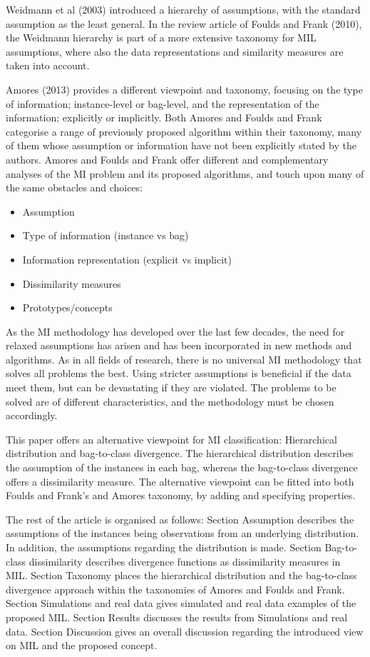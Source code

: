 {\color{green} Weidmann et al (2003)} introduced a hierarchy of assumptions, with the standard assumption as the least general. 
In the review article of {\color{green} Foulds and Frank (2010)}, the Weidmann hierarchy is part of a more extensive taxonomy for MIL assumptions, where also the data representations and similarity measures are taken into account. 

{\color{green} Amores (2013)} provides a different viewpoint and taxonomy, focusing on the type of information; instance-level or bag-level, and the representation of the information; explicitly or implicitly. 
Both Amores and Foulds and Frank categorise a range of previously proposed algorithm within their taxonomy, many of them whose assumption or information have not been explicitly stated by the authors. 
Amores and Foulds and Frank offer different and complementary analyses of the MI problem and its proposed algorithms, and touch upon many of the same obstacles and choices: 
\begin{itemize}
  \item Assumption
  \item Type of information (instance vs bag)
  \item Information representation (explicit vs implicit)
  \item Dissimilarity measures
  \item Prototypes/concepts
\end{itemize}

As the MI methodology has developed over the last few decades, the need for relaxed assumptions has arisen and has been incorporated in new methods and algorithms. 
As in all fields of research, there is no universal MI methodology that solves all problems the best. 
Using stricter assumptions is beneficial if the data meet them, but can be devastating if they are violated.
The problems to be solved are of different characteristics, and the methodology must be chosen accordingly. 

This paper offers an alternative viewpoint for MI classification: Hierarchical distribution and bag-to-class divergence. 
The hierarchical distribution describes the assumption of the instances in each bag, whereas the bag-to-class divergence offers a dissimilarity measure. 
The alternative viewpoint can be fitted into both Foulds and Frank's and Amores taxonomy, by adding and specifying properties. 

The rest of the article is organised as follows: 
Section {\color{blue} Assumption} describes the assumptions of the instances being observations from an underlying distribution. 
In addition, the assumptions regarding the distribution is made. 
Section {\color{blue} Bag-to-class dissimilarity} describes divergence functions as dissimilarity measures in MIL.
Section {\color{blue} Taxonomy} places the hierarchical distribution and the bag-to-class divergence approach within the taxonomies of Amores and Foulds and Frank.
Section {\color{blue} Simulations and real data} gives simulated and real data examples of the proposed MIL.
Section {\color{blue} Results} discusses the results from Simulations and real data.
Section {\color{blue} Discussion} gives an overall discussion regarding the introduced view on MIL and the proposed concept. 


